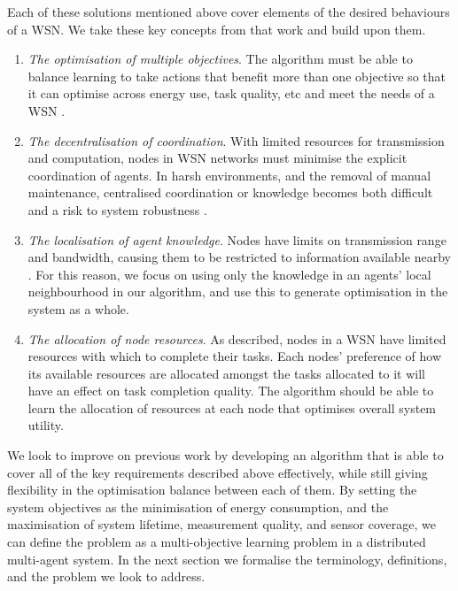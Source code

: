 Each of these solutions mentioned above cover elements of the desired behaviours of a WSN. We take these key concepts from that work and build upon them.
\begin{enumerate}
	\item \textit{The optimisation of multiple objectives}.  The algorithm must be able to balance learning to take actions that benefit more than one objective so that it can optimise across energy use, task quality, etc and meet the needs of a WSN \citep{Guo2019, s150717572, SENGUPTA2013405}.

	\item \textit{The decentralisation of coordination}. With limited resources for transmission and computation, nodes in WSN networks must minimise the explicit coordination of agents.  In harsh environments, and the removal of manual maintenance, centralised coordination or knowledge becomes both difficult and a risk to system robustness \cite{XXX}.
	
	\item \textit{The localisation of agent knowledge}. Nodes have limits on transmission range and bandwidth, causing them to be restricted to information available nearby \citep{10.1007/978-3-642-11814-2_4}. For this reason, we focus on using only the knowledge in an agents' local neighbourhood in our algorithm, and use this to generate optimisation in the system as a whole.
	
	\item \textit{The allocation of node resources}. As described, nodes in a WSN have limited resources with which to complete their tasks. Each nodes' preference of how its available resources are allocated amongst the tasks allocated to it will have an effect on task completion quality. The algorithm should be able to learn the allocation of resources at each node that optimises overall system utility. 
\end{enumerate}

We look to improve on previous work by developing an algorithm that is able to cover all of the key requirements described above effectively, while still giving flexibility in the optimisation balance between each of them. By setting the system objectives as the minimisation of energy consumption, and the maximisation of system lifetime, measurement quality, and sensor coverage, we can define the problem as a multi-objective learning problem in a distributed multi-agent system. In the next section we formalise the terminology, definitions, and the problem we look to address.


